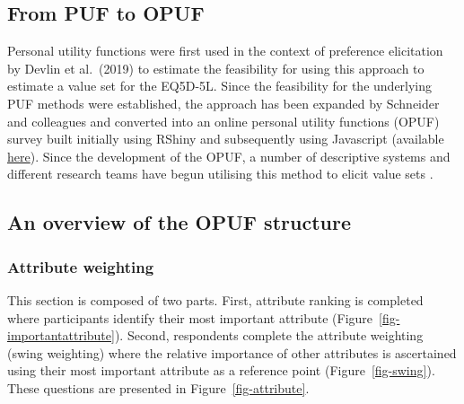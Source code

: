 \documentclass[
  number,
  preprint]{elsarticle}
\begin{document}
\subsection{From PUF to OPUF}\label{from-puf-to-opuf}

Personal utility functions were first used in the context of preference
elicitation by Devlin et al.~(2019) \citep{Devlin2019AFunctions} to
estimate the feasibility for using this approach to estimate a value set
for the EQ5D-5L. Since the feasibility for the underlying PUF methods
were established, the approach has been expanded by Schneider and
colleagues and converted into an online personal utility functions
(OPUF) survey built initially using RShiny
\citep{Schneider2022TheStates} and subsequently using Javascript
(available \href{https://eq5d5l.me}{here}). Since the development of the
OPUF, a number of descriptive systems and different research teams have
begun utilising this method to elicit value sets
\citep{Bray2024DevelopmentImpairment, Brodszky2023PCR108States}.

\subsection{An overview of the OPUF
structure}\label{an-overview-of-the-opuf-structure}

\subsubsection{Attribute weighting}\label{attribute-weighting}

This section is composed of two parts. First, attribute ranking is
completed where participants identify their most important attribute
(Figure~\ref{fig-importantattribute}). Second, respondents complete the
attribute weighting (swing weighting) where the relative importance of
other attributes is ascertained using their most important attribute as
a reference point (Figure~\ref{fig-swing}). These questions are
presented in Figure~\ref{fig-attribute}.
\end{document}
